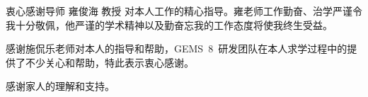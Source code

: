 
\begin{ack}

  衷心感谢导师 雍俊海 教授 对本人工作的精心指导。雍老师工作勤奋、治学严谨令我十分敬佩，他严谨的学术精神以及勤奋忘我的工作态度将使我终生受益。
  
  感谢施侃乐老师对本人的指导和帮助，GEMS~8~研发团队在本人求学过程中的提供了不少关心和帮助，特此表示衷心感谢。

  感谢家人的理解和支持。

\end{ack}
